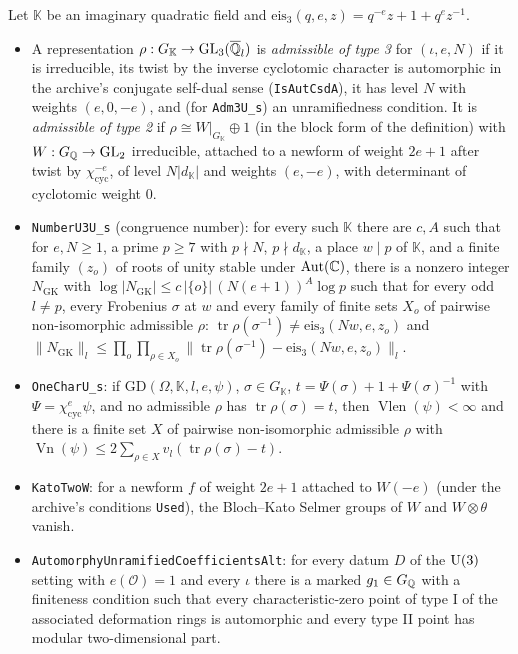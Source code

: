 \begin{definition}\label{sha:u3-inputs}
Let $\mathbb K$ be an imaginary quadratic field and
$\mathrm{eis}_3(q,e,z)=q^{-e}z+1+q^ez^{-1}$.
\begin{itemize}
\item A representation $\rho:G_{\mathbb K}\to\mathrm{GL}_3(\overline{\mathbb{Q}}_l)$ is \emph{admissible of
type 3} for $(\iota,e,N)$ if it is irreducible, its twist by the inverse cyclotomic character
is automorphic in the archive's conjugate self-dual sense (\texttt{IsAutCsdA}), it has level
$N$ with weights $(e,0,-e)$, and (for \texttt{Adm3U\_s}) an unramifiedness condition. It is
\emph{admissible of type 2} if $\rho\cong W|_{G_{\mathbb K}}\oplus1$ (in the block form of
the definition) with $W:G_{\mathbb{Q}}\to\mathrm{GL}_2$ irreducible, attached to a newform of weight $2e+1$ after
twist by $\chi_{\mathrm{cyc}}^{-e}$, of level $N|d_{\mathbb K}|$ and weights $(e,-e)$, with
determinant of cyclotomic weight $0$.
\item \texttt{NumberU3U\_s} (congruence number): for every such $\mathbb K$ there are $c,A$
such that for $e,N\ge1$, a prime $p\ge7$ with $p\nmid N$, $p\nmid d_{\mathbb K}$, a place
$w\mid p$ of $\mathbb K$, and a finite family $(z_o)$ of roots of unity stable under
$\mathrm{Aut}(\mathbb{C})$, there is a nonzero integer $N_{\mathrm{GK}}$ with
$\log|N_{\mathrm{GK}}|\le c\,|\{o\}|\,(N(e+1))^A\log p$ such that for every odd $l\ne p$, every
Frobenius $\sigma$ at $w$ and every family of finite sets $X_o$ of pairwise non-isomorphic
admissible $\rho$: $\operatorname{tr}\rho(\sigma^{-1})\ne\mathrm{eis}_3(Nw,e,z_o)$ and
$\|N_{\mathrm{GK}}\|_l\le\prod_o\prod_{\rho\in X_o}\|\operatorname{tr}\rho(\sigma^{-1})-
\mathrm{eis}_3(Nw,e,z_o)\|_l$.
\item \texttt{OneCharU\_s}: if $\mathrm{GD}(\Omega,\mathbb K,l,e,\psi)$, $\sigma\in G_{\mathbb K}$,
$t=\Psi(\sigma)+1+\Psi(\sigma)^{-1}$ with $\Psi=\chi_{\mathrm{cyc}}^e\psi$, and no admissible
$\rho$ has $\operatorname{tr}\rho(\sigma)=t$, then $\operatorname{Vlen}(\psi)<\infty$ and there
is a finite set $X$ of pairwise non-isomorphic admissible $\rho$ with
$\operatorname{Vn}(\psi)\le2\sum_{\rho\in X}v_l(\operatorname{tr}\rho(\sigma)-t)$.
\item \texttt{KatoTwoW}: for a newform $f$ of weight $2e+1$ attached to $W(-e)$ (under the
archive's conditions \texttt{Used}), the Bloch--Kato Selmer groups of $W$ and $W\otimes\theta$
vanish.
\item \texttt{AutomorphyUnramifiedCoefficientsAlt}: for every datum $D$ of the $\mathrm{U}(3)$ setting
with $e(\mathcal O)=1$ and every $\iota$ there is a marked $g_1\in G_{\mathbb{Q}}$ with a finiteness
condition such that every characteristic-zero point of type I of the associated deformation
rings is automorphic and every type II point has modular two-dimensional part.
\end{itemize}
\end{definition}
